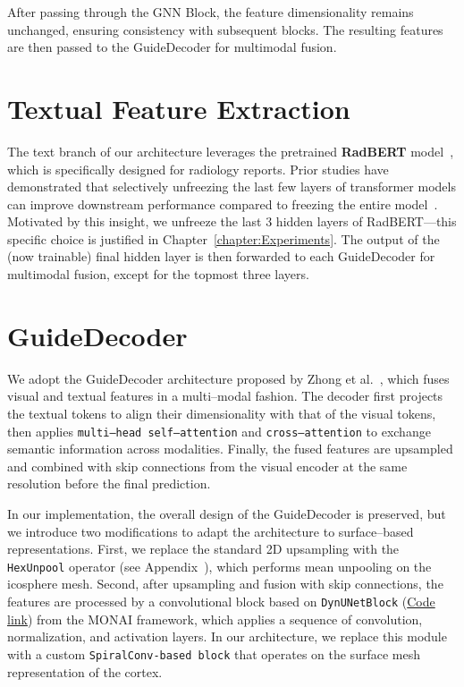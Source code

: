 \documentclass[FCD_GNN.tex]{subfiles}
\begin{document}
After passing through the GNN Block, the feature dimensionality remains unchanged, ensuring consistency with subsequent blocks. The resulting features are then passed to the GuideDecoder for multimodal fusion.

\section{Textual Feature Extraction}

The text branch of our architecture leverages the pretrained \textbf{RadBERT} model~\cite{Park2022AIforNeuro}, which is specifically designed for radiology reports.   
Prior studies have demonstrated that selectively unfreezing the last few layers of transformer models can improve downstream performance compared to freezing the entire model~\cite{Peters2019ToTune}.  
Motivated by this insight, we unfreeze the last 3 hidden layers of RadBERT—this specific choice is justified in Chapter~\ref{chapter:Experiments}.  
The output of the (now trainable) final hidden layer is then forwarded to each GuideDecoder for multimodal fusion, except for the topmost three layers.

\section{GuideDecoder}
We adopt the GuideDecoder architecture proposed by Zhong et al.~\cite{Zhong2023Ariadne}, 
which fuses visual and textual features in a multi–modal fashion. 
The decoder first projects the textual tokens to align their dimensionality with 
that of the visual tokens, then applies \texttt{multi–head self–attention} and \texttt{cross–attention} 
to exchange semantic information across modalities. 
Finally, the fused features are upsampled and combined with skip connections 
from the visual encoder at the same resolution before the final prediction.

In our implementation, the overall design of the GuideDecoder is preserved, 
but we introduce two modifications to adapt the architecture to surface–based representations. 
First, we replace the standard 2D upsampling with the \texttt{HexUnpool} operator 
(see Appendix~), which performs mean unpooling on the icosphere mesh. 
Second, after upsampling and fusion with skip connections, the features are processed by a convolutional 
block based on \texttt{DynUNetBlock} (\href{https://docs.monai.io/en/0.3.0/_modules/monai/networks/blocks/dynunet_block.html}{Code link}) from the MONAI framework, which applies a sequence of convolution, normalization, 
and activation layers. In our architecture, we replace this module with a custom \texttt{SpiralConv-based block} 
that operates on the surface mesh representation of the cortex. 
\end{document}
